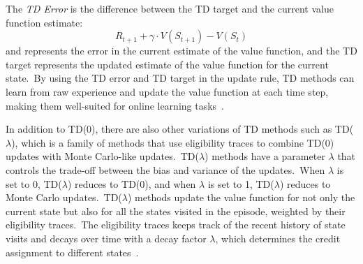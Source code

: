 \documentclass[../xlapes02]{subfiles}
\begin{document}
    The \emph{TD Error} is the difference between the TD target and the current value function estimate:
    \begin{equation}
        \label{eq:td-error}
        R_{t+1}+\gamma\cdot V(S_{t+1})-V(S_t)
    \end{equation}
    and represents the error in the current estimate of the value function, and the TD target represents the updated estimate of the value function for the current state.\ By using the TD error and TD target in the update rule, TD methods can learn from raw experience and update the value function at each time step, making them well-suited for online learning tasks~\cite{sutton2018reinforcement}.



    In addition to TD(0), there are also other variations of TD methods such as TD($\lambda$), which is a family of methods that use eligibility traces to combine TD(0) updates with Monte Carlo-like updates.\ TD($\lambda$) methods have a parameter $\lambda$ that controls the trade-off between the bias and variance of the updates.\ When $\lambda$ is set to 0, TD($\lambda$) reduces to TD(0), and when $\lambda$ is set to 1, TD($\lambda$) reduces to Monte Carlo updates.\ TD($\lambda$) methods update the value function for not only the current state but also for all the states visited in the episode, weighted by their eligibility traces.\ The eligibility traces keeps track of the recent history of state visits and decays over time with a decay factor $\lambda$, which determines the credit assignment to different states~\cite{sutton2018reinforcement}.
\end{document}
